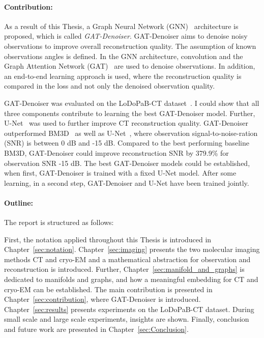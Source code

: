 \paragraph{Contribution:}

As a result of this Thesis, a Graph Neural Network (GNN)~\cite{GNN} architecture is proposed, which is called \textit{GAT-Denoiser}.
GAT-Denoiser aims to denoise noisy observations to improve overall reconstruction quality.
The assumption of known observations angles is defined.
In the GNN architecture, convolution and the Graph Attention Network (GAT)~\cite{GAT} are used to denoise observations.
In addition, an end-to-end learning approach is used, where the reconstruction quality is compared in the loss
and not only the denoised observation quality.

GAT-Denoiser was evaluated on the LoDoPaB-CT dataset~\cite{lodopab-dataset}.
I could show that all three components contribute to learning the best GAT-Denoiser model.
Further, U-Net~\cite{unet-tomography} was used to further improve CT reconstruction quality.
GAT-Denoiser outperformed BM3D~\cite{bm3d} as well as U-Net~\cite{unet-tomography},
where observation signal-to-noise-ration (SNR) is between 0 dB and -15 dB.
Compared to the best performing baseline BM3D, GAT-Denoiser could improve reconstruction SNR 
by 379.9\% for observation SNR -15 dB.
The best GAT-Denoiser models could be established, when first, GAT-Denoiser is trained with a fixed U-Net model.
After some learning, in a second step, GAT-Denoiser and U-Net have been trained jointly.


\paragraph{Outline:}

The report is structured as follows: 

First, the notation applied throughout this Thesis is introduced in Chapter~\ref{sec:notation}.
 Chapter~\ref{sec:imaging} presents the two molecular imaging methods
CT and cryo-EM and a mathematical abstraction for observation and reconstruction is introduced.
Further, Chapter~\ref{sec:manifold_and_graphs} is dedicated to manifolds and graphs,
and how a meaningful embedding for CT and cryo-EM can be established. 
The main contribution is presented in Chapter~\ref{sec:contribution}, 
where GAT-Denoiser is introduced. Chapter~\ref{sec:results} presents experiments on the LoDoPaB-CT dataset.
During small scale and large scale experiments, insights are shown.
Finally, conclusion and future work are presented in Chapter~\ref{sec:Conclusion}.

